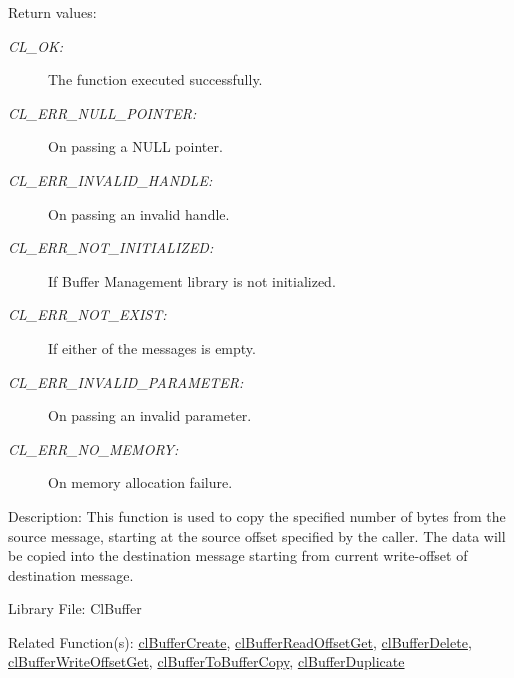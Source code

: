 \begin{Desc}
\item[Return values:]
\begin{description}
\item[{\em CL\_\-OK:}]The function executed successfully. \item[{\em CL\_\-ERR\_\-NULL\_\-POINTER:}]On passing a NULL pointer. \item[{\em CL\_\-ERR\_\-INVALID\_\-HANDLE:}]On passing an invalid handle. \item[{\em CL\_\-ERR\_\-NOT\_\-INITIALIZED:}]If Buffer Management library is not initialized. \item[{\em CL\_\-ERR\_\-NOT\_\-EXIST:}]If either of the messages is empty. \item[{\em CL\_\-ERR\_\-INVALID\_\-PARAMETER:}]On passing an invalid parameter. \item[{\em CL\_\-ERR\_\-NO\_\-MEMORY:}]On memory allocation failure.\end{description}
\end{Desc}
\begin{Desc}
\item[Description:]This function is used to copy the specified number of bytes from the source message, starting at the source offset specified by the caller. The data will be copied into the destination message starting from current write-offset of destination message.\end{Desc}
\begin{Desc}
\item[Library File:]Cl\-Buffer\end{Desc}
\begin{Desc}
\item[Related Function(s):]\hyperlink{pagebuf103}{cl\-Buffer\-Create}, \hyperlink{pagebuf117}{cl\-Buffer\-Read\-Offset\-Get}, 
\hyperlink{pagebuf105}{cl\-Buffer\-Delete}, \hyperlink{pagebuf118}{cl\-Buffer\-Write\-Offset\-Get}, 
\hyperlink{pagebuf126}{cl\-Buffer\-To\-Buffer\-Copy}, \hyperlink{pagebuf127}{cl\-Buffer\-Duplicate} \end{Desc}


\newpage
